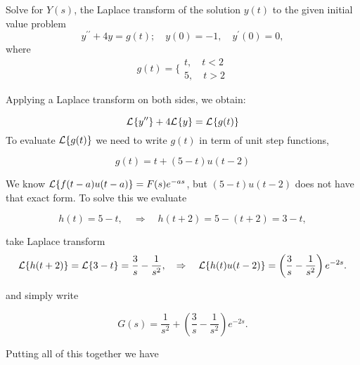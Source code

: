 \documentclass[11pt]{article}
\begin{document}
\begin{problem}
Solve for $Y(s)$, the Laplace transform of the solution $y(t)$ to the given initial value problem
\begin{equation*}
y^{\prime \prime} +4y = g(t) ; \quad y(0)=-1, \quad y^{\prime}(0) = 0,
\end{equation*}
where
\begin{equation*}
g(t) = \bigg\{ \begin{array}{ccc}
t, \quad t<2 \\
5, \quad t>2
\end{array}
\end{equation*}
\end{problem}
\begin{solution}
Applying a Laplace transform on both sides, we obtain:

\begin{equation*}
{\cal L}^{}\{ y^{\prime \prime} \} +4 {\cal L}^{}\{ y \} = {\cal L}^{}\{ g(t) \}
\end{equation*}
To evaluate ${\cal L}\{g(t)\}$ we need to write $g(t)$ in term of unit step functions,

\[g(t)=t+(5-t)u(t-2)\]

We know ${\cal L}\{f(t-a)u(t-a)\}=F(s)e^{-as}$, but $(5-t)u(t-2)$ does not have that exact form. To solve this we evaluate

\[h(t)=5-t, \quad \Rightarrow \quad h(t+2)=5-(t+2)=3-t,\] 

take Laplace transform
\[{\cal L}\{h(t+2)\}= {\cal L}\{3-t\}=\frac{3}{s}-\frac{1}{s^{2}},\quad \Rightarrow \quad {\cal L}\{h(t)u(t-2)\}=\left( \frac{3}{s}-\frac{1}{s^{2}} \right)e^{-2s}.\]

and simply write

\[G(s)=\frac{1}{s^{2}}+ \left( \frac{3}{s}-\frac{1}{s^{2}} \right)e^{-2s}.\]



Putting all of this together we have


\end{solution}
\end{document}

